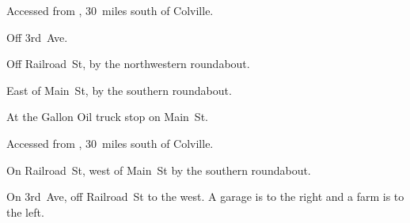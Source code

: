 
\begin{LocationList}

Accessed from , 30~miles south of Colville.

Off  3rd~Ave.

Off Railroad~St, by the northwestern roundabout.

East of  Main~St, by the southern roundabout.

At the Gallon Oil truck stop on   Main~St.

Accessed from , 30~miles south of Colville.

On Railroad~St, west of  Main~St by the southern roundabout.

On 3rd~Ave, off Railroad~St to the west.
A garage is to the right and a farm is to the left.

\end{LocationList}
